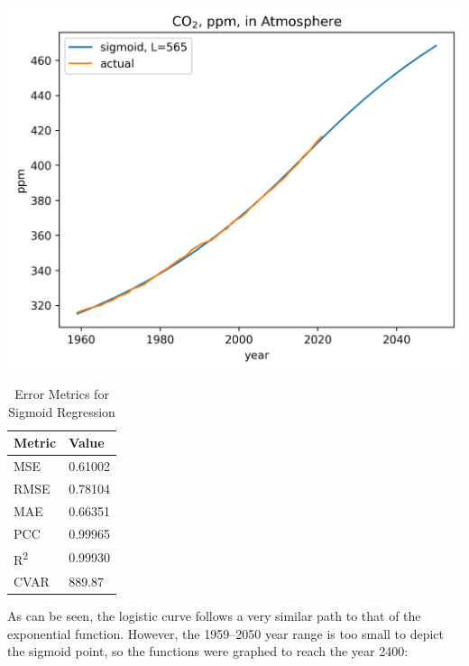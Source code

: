 \documentclass{mcmthesis}
\begin{document}
    \begin{table}[h]
        \begin{minipage}{0.7\linewidth}
            \centering
            \includegraphics[width=\textwidth]{co2_sigm_565}%
            \label{fig:co2_logi}
        \end{minipage}%
        \begin{minipage}{0.3\linewidth}
            \centering
            \begin{tabular}{ll}
                \toprule
                Metric               & Value  \\
                \midrule
                MSE                  & 0.61002 \\
                RMSE                 & 0.78104 \\
                MAE                  & 0.66351 \\
                PCC                  & 0.99965 \\
                R\textsuperscript{2} & 0.99930 \\
                CVAR                 & 889.87 \\
                \bottomrule
            \end{tabular}
            \caption{Error Metrics for Sigmoid Regression}
            \label{tab:co2_logi_err}
        \end{minipage}
    \end{table}

    As can be seen, the logistic curve follows a very similar path to that of the exponential function. However, the 1959--2050 year range is too small to depict the sigmoid point, so the functions were graphed to reach the year 2400:
\end{document}
